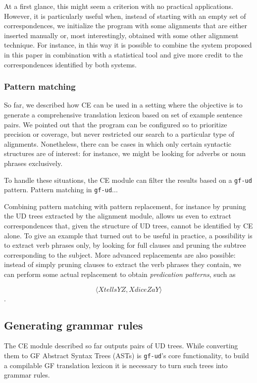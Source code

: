 \documentclass[11pt]{article}
\begin{document}
At a first glance, this might seem a criterion with no practical applications. 
However, it is particularly useful when, instead of starting with an empty set of correspondences, we initialize the program with some alignments that are either inserted manually or, most interestingly, obtained with some other alignment technique. 
For instance, in this way it is possible to combine the system proposed in this paper in combination with a statistical tool and give more credit to the correspondences identified by both systems.

\subsubsection{Pattern matching}
So far, we described how CE can be used in a setting where the objective is to generate a comprehensive translation lexicon based on set of example sentence pairs.
We pointed out that the program can be configured so to prioritize precision or coverage, but never restricted our search to a particular type of alignments.
Nonetheless, there can be cases in which only certain syntactic structures are of interest: for instance, we might be looking for adverbs or noun phrases exclusively.

To handle these situations, the CE module can filter the results based on a \texttt{gf-ud} pattern.
Pattern matching in \texttt{gf-ud}...

Combining pattern matching with pattern replacement, for instance by pruning the UD trees extracted by the alignment module, allows us even to extract correspondences that, given the structure of UD trees, cannot be identified by CE alone. 
To give an example that turned out to be useful in practice, a possibility is to extract verb phrases only, by looking for full clauses and pruning the subtree corresponding to the subject. 
More advanced replacements are also possible: instead of simply pruning clauses to extract the verb phrases they contain, we can perform some actual replacement to obtain \textit{predication patterns}, such as

$$\langle X tells Y Z, X dice Z a Y\rangle$$.


\subsection{Generating grammar rules}
The CE module described so far outputs pairs of UD trees. 
While converting them to GF Abstract Syntax Trees (ASTs) is \texttt{gf-ud}'s core functionality, to build a compilable GF translation lexicon it is necessary to turn such trees into grammar rules.
\end{document}
